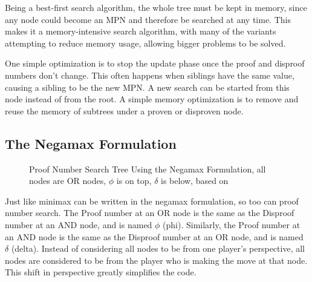 Being a best-first search algorithm, the whole tree must be kept in memory, since any node could become an MPN and therefore be searched at any time. This makes it a memory-intensive search algorithm, with many of the variants attempting to reduce memory usage, allowing bigger problems to be solved.

One simple optimization is to stop the update phase once the proof and disproof numbers don't change. This often happens when siblings have the same value, causing a sibling to be the new MPN. A new search can be started from this node instead of from the root. A simple memory optimization is to remove and reuse the memory of subtrees under a proven or disproven node.

\subsection{The Negamax Formulation} \label{sec:NegaPDS}

\begin{figure}
\centering
{}
\caption[Proof Number Search Tree Using the Negamax Formulation]{Proof Number Search Tree Using the Negamax Formulation, all nodes are OR nodes, $\phi$ is on top, $\delta$ is below, based on \cite{winands2003-PDS-PN}}
\label{fig:negamaxtree}
\end{figure}

Just like minimax can be written in the negamax formulation, so too can proof number search. The Proof number at an OR node is the same as the Disproof number at an AND node, and is named $\phi$ (phi). Similarly, the Proof number at an AND node is the same as the Disproof number at an OR node, and is named $\delta$ (delta). Instead of considering all nodes to be from one player's perspective, all nodes are considered to be from the player who is making the move at that node. This shift in perspective greatly simplifies the code.


